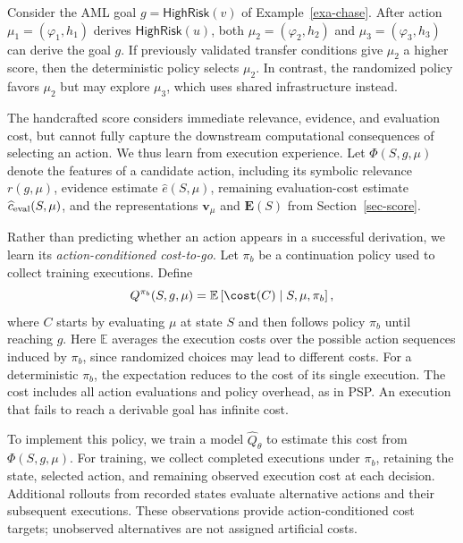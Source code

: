 \begin{example}
\label{exa-policy}
Consider the AML goal
$g=\textsf{HighRisk}(v)$ of
Example~\ref{exa-chase}.
After action $\mu_1=(\varphi_1,h_1)$ derives
$\textsf{HighRisk}(u)$, both
$\mu_2=(\varphi_2,h_2)$ and
$\mu_3=(\varphi_3,h_3)$ can derive the goal $g$.
If previously validated transfer conditions
give $\mu_2$ a higher score, then the deterministic
policy selects $\mu_2$. In contrast,
the randomized policy favors $\mu_2$ but
may explore $\mu_3$, which uses shared
infrastructure instead.
\end{example}
\vspace{-1.4ex}

The handcrafted score considers immediate
relevance, evidence, and evaluation cost,
but cannot fully capture the downstream
computational consequences of selecting an
action. We thus learn from execution
experience.
Let $\Phi(S,g,\mu)$ denote the features of
a candidate action, including its symbolic
relevance $r(g,\mu)$, evidence estimate
$\widehat e(S,\mu)$, remaining evaluation-cost
estimate $\widehat c_{\rm eval}(S,\mu)$,
and the representations $\mathbf v_\mu$
and $\mathbf E(S)$ from Section~\ref{sec-score}.

Rather than predicting whether an action
appears in a successful derivation, we learn
its {\em action-conditioned cost-to-go}.
Let $\pi_b$ be a continuation policy used
to collect training executions.
Define
\vspace{-0.7ex}\[
Q^{\pi_b}(S,g,\mu)=
\mathbb E\left[
\cost(C)\mid S,\mu,\pi_b
\right],
\vspace{-0.7ex}\]
where $C$ starts by evaluating $\mu$ at state $S$
and then follows policy $\pi_b$ until reaching $g$.
Here $\mathbb E$ averages the execution costs over
the possible action sequences induced by $\pi_b$,
since randomized choices may lead to different
costs. For a deterministic $\pi_b$, the expectation
reduces to the cost of its single execution.
The cost includes all action evaluations and
policy overhead, as in PSP. An execution that
fails to reach a derivable goal has infinite cost.


To implement this policy,
we train a model $\widehat Q_\theta$
to estimate this cost from
$\Phi(S,g,\mu)$.
For training, we collect completed executions
under $\pi_b$, retaining the state, selected
action, and remaining observed execution cost
at each decision.
Additional rollouts from recorded states
evaluate alternative actions and their
subsequent executions. These observations
provide action-conditioned cost targets;
unobserved alternatives are not assigned
artificial costs.


